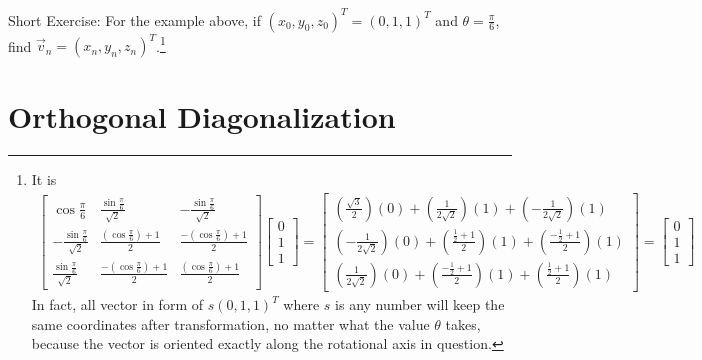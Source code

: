 Short Exercise: For the example above, if $(x_0, y_0, z_0)^T = (0,1,1)^T$ and $\theta = \frac{\pi}{6}$, find $\vec{v}_n = (x_n, y_n, z_n)^T$.\footnote{It is
\begin{align*}
\begin{bmatrix}
\cos{\frac{\pi}{6}} & \frac{\sin{\frac{\pi}{6}}}{\sqrt{2}} & -\frac{\sin{\frac{\pi}{6}}}{\sqrt{2}} \\
-\frac{\sin{\frac{\pi}{6}}}{\sqrt{2}} & \frac{(\cos{\frac{\pi}{6}}) + 1}{2} & \frac{-(\cos{\frac{\pi}{6}}) + 1}{2} \\
\frac{\sin\frac{\pi}{6}}{\sqrt{2}} & \frac{-(\cos{\frac{\pi}{6}}) + 1}{2} & \frac{(\cos{\frac{\pi}{6}}) + 1}{2}
\end{bmatrix}
\begin{bmatrix}
0 \\
1 \\
1
\end{bmatrix}
=
\begin{bmatrix}
(\frac{\sqrt{3}}{2})(0) + (\frac{1}{2\sqrt{2}})(1) + (-\frac{1}{2\sqrt{2}})(1) \\
(-\frac{1}{2\sqrt{2}})(0) + (\frac{\frac{1}{2} + 1}{2})(1) + (\frac{-\frac{1}{2} + 1}{2})(1) \\
(\frac{1}{2\sqrt{2}})(0) + (\frac{-\frac{1}{2} + 1}{2})(1) + (\frac{\frac{1}{2} + 1}{2})(1)
\end{bmatrix}
=
\begin{bmatrix}
0 \\
1 \\
1
\end{bmatrix}
\end{align*}
In fact, all vector in form of $s(0,1,1)^T$ where $s$ is any number will keep the same coordinates after transformation, no matter what the value $\theta$ takes, because the vector is oriented exactly along the rotational axis in question.}

\section{Orthogonal Diagonalization}
\label{section:orthogonaldiagreal}

